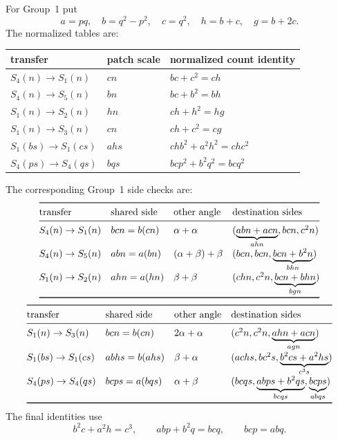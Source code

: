 \documentclass[11pt]{amsart}
\theoremstyle{definition}
\theoremstyle{remark}
\begin{document}
For Group~1 put
\[
 a=pq,\quad b=q^2-p^2,\quad c=q^2,\quad
 h=b+c,\quad g=b+2c.
\]
The normalized tables are:
\begin{center}
\small
\renewcommand{\arraystretch}{1.12}
\begin{tabular}{@{}lll@{}}
\toprule
transfer & patch scale & normalized count identity \\
\midrule
$S_4(n)\to S_1(n)$ & $cn$ & $bc+c^2=ch$ \\
$S_4(n)\to S_5(n)$ & $bn$ & $bc+b^2=bh$ \\
$S_1(n)\to S_2(n)$ & $hn$ & $ch+h^2=hg$ \\
$S_1(n)\to S_3(n)$ & $cn$ & $ch+c^2=cg$ \\
$S_1(bs)\to S_1(cs)$ & $ahs$ &
  $chb^2+a^2h^2=chc^2$ \\
$S_4(ps)\to S_4(qs)$ & $bqs$ &
  $bcp^2+b^2q^2=bcq^2$ \\
\bottomrule
\end{tabular}
\end{center}

The corresponding Group~1 side checks are:
\[
\renewcommand{\arraystretch}{1.15}
\begin{array}{@{}llll@{}}
\toprule
\text{transfer}&\text{shared side}&\text{other angle}
 &\text{destination sides}\\
\midrule
S_4(n)\to S_1(n)
 &bcn=b(cn)&\alpha+\alpha
 &(\underbrace{abn+acn}_{ahn},bcn,c^2n)\\
S_4(n)\to S_5(n)
 &abn=a(bn)&(\alpha+\beta)+\beta
 &(bcn,bcn,\underbrace{bcn+b^2n}_{bhn})\\
S_1(n)\to S_2(n)
 &ahn=a(hn)&\beta+\beta
 &(chn,c^2n,\underbrace{bcn+bhn}_{bgn})\\
\bottomrule
\end{array}
\]
\[
\renewcommand{\arraystretch}{1.15}
\begin{array}{@{}llll@{}}
\toprule
\text{transfer}&\text{shared side}&\text{other angle}
 &\text{destination sides}\\
\midrule
S_1(n)\to S_3(n)
 &bcn=b(cn)&2\alpha+\alpha
 &(c^2n,c^2n,\underbrace{ahn+acn}_{agn})\\
S_1(bs)\to S_1(cs)
 &abhs=b(ahs)&\beta+\alpha
 &(achs,bc^2s,\underbrace{b^2cs+a^2hs}_{c^3s})\\
S_4(ps)\to S_4(qs)
 &bcps=a(bqs)&\alpha+\beta
 &(bcqs,\underbrace{abps+b^2qs}_{bcqs},
   \underbrace{bcps}_{abqs})\\
\bottomrule
\end{array}
\]
The final identities use
\[
 b^2c+a^2h=c^3,\qquad abp+b^2q=bcq,\qquad bcp=abq.
\]
\end{document}
